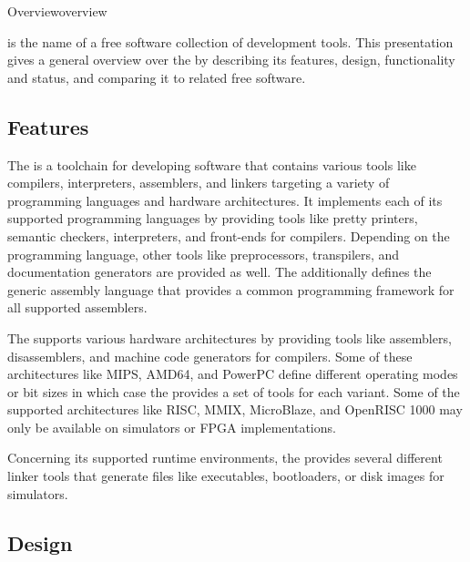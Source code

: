 \begin{presentation}{Overview}{overview}

\emph{\ecs{}} is the name of a free software collection of development tools.
This presentation gives a general overview over the \ecs{} by describing its features, design, functionality and status, and comparing it to related free software.


\subsection{Features}

The \ecs{} is a toolchain for developing software that contains various tools like compilers, interpreters, assemblers, and linkers targeting a variety of programming languages and hardware architectures.
It implements each of its supported programming languages by providing tools like pretty printers, semantic checkers, interpreters, and front-ends for compilers.
Depending on the programming language, other tools like preprocessors, transpilers, and documentation generators are provided as well.
The \ecs{} additionally defines the generic assembly language that provides a common programming framework for all supported assemblers.
\ifbook\else\nocite{cpp}\nocite{false}\nocite{oberon}\nocite{assembly}\fi


The \ecs{} supports various hardware architectures by providing tools like assemblers, disassemblers, and machine code generators for compilers.
Some of these architectures like MIPS, AMD64, and PowerPC define different operating modes or bit sizes in which case the \ecs{} provides a set of tools for each variant.
Some of the supported architectures like RISC, MMIX, MicroBlaze, and OpenRISC 1000 may only be available on simulators or FPGA implementations.


Concerning its supported runtime environments, the \ecs{} provides several different linker tools that generate files like executables, bootloaders, or disk images for simulators.


\subsection{Design}


\end{presentation}
